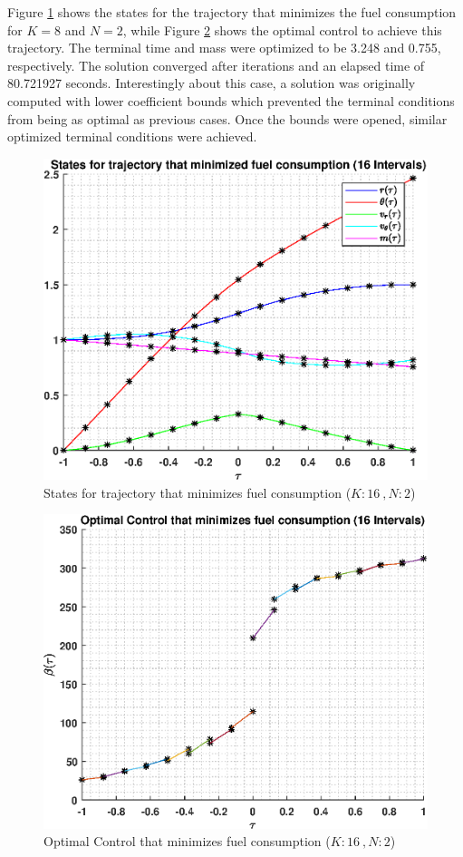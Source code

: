 \documentclass[]{article}
\begin{document}
Figure \ref{fig:directStatesK16Poly2} shows the states for the trajectory that minimizes the fuel consumption for \(K = 8\) and  \(N = 2\), while Figure \ref{fig:directControlK16Poly2} shows the optimal control to achieve this trajectory. The terminal time and mass were optimized to be 3.248 and 0.755, respectively. The solution converged after iterations and an elapsed time of 80.721927 seconds. Interestingly about this case, a solution was originally computed with lower coefficient bounds which prevented the terminal conditions from being as optimal as previous cases. Once the bounds were opened, similar optimized terminal conditions were achieved.
\begin{figure}
	\centering
	\includegraphics[scale=0.75]{directStatesK16Poly2.eps}
	\caption{States for trajectory that minimizes fuel consumption (\(K:16\ , N:2\))}
	\label{fig:directStatesK16Poly2}
\end{figure}
\begin{figure}
	\centering
	\includegraphics[scale=0.75]{directControlK16Poly2.eps}
	\caption{Optimal Control that minimizes fuel consumption (\(K:16\ , N:2\))}
	\label{fig:directControlK16Poly2}
\end{figure}
\FloatBarrier
\end{document}
